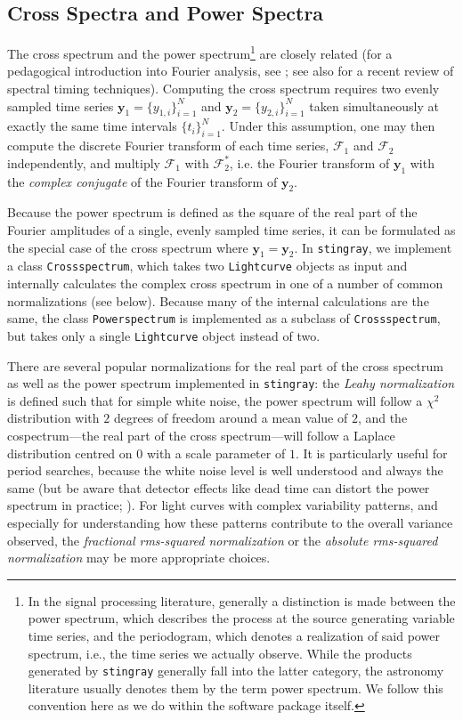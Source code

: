 \documentclass[twocolumn]{aastex62}
\newcommand{\stingray}{\texttt{stingray}\xspace}
\newcommand{\lightcurve}{\texttt{Lightcurve}\xspace}
\newcommand{\crossspectrum}{\texttt{Crossspectrum}\xspace}
\newcommand{\powerspectrum}{\texttt{Powerspectrum}\xspace}
\begin{document}
\subsection{Cross Spectra and Power Spectra}
\label{sec:csps}

The cross spectrum and the power spectrum\footnote{In the signal processing literature, generally a distinction is made between the power spectrum, which
describes the process at the source generating variable time series, and the periodogram, which denotes a realization of said power spectrum, i.e., the time series we actually observe. While the products generated by \stingray generally fall into the latter category, the astronomy literature usually denotes them by the term power spectrum. We follow this convention here as we do within the software package itself.} 
are closely related (for a pedagogical introduction into Fourier analysis, see \citealt{vanderklis1989}; see also \citealt{uttley2014} for a recent review of spectral timing techniques). 
Computing the cross spectrum requires two evenly sampled time series $\mathbf{y}_1 = \{y_{1,i}\}_{i=1}^{N} $ and $\mathbf{y}_2 =  \{y_{2,i}\}_{i=1}^{N}$ taken simultaneously at exactly the same time intervals $\{t_i \}_{i=1}^N$. 
Under this assumption, one may then compute the discrete Fourier transform of each time series, $\mathcal{F}_1$ and $\mathcal{F}_2$ independently, and multiply $\mathcal{F}_1$ with $\mathcal{F}^{*}_2$, i.e. the Fourier transform of $\mathbf{y}_1$ with the \textit{complex conjugate} of the Fourier transform of $\mathbf{y}_2$. 

Because the power spectrum is defined as the square of the real part of the Fourier amplitudes of a single, evenly sampled time series, it can be formulated as the special case of the cross spectrum where $\mathbf{y}_1 = \mathbf{y}_2$. 
In \stingray, we implement a class \crossspectrum, which takes two \lightcurve objects as input and internally calculates the complex cross spectrum in one of a number of common normalizations (see below).  Because many of the internal calculations are the same, the class \powerspectrum is implemented as a subclass of \crossspectrum, but takes only a single \lightcurve object instead of two. 

There are several popular normalizations for the real part of the cross spectrum as well as the power spectrum implemented in \stingray: the \textit{Leahy normalization} \citep{leahy1983} is defined such that for simple white noise, the power spectrum will follow a $\chi^2$ distribution with $2$ degrees of freedom around a mean value of $2$, and the cospectrum---the real part of the cross spectrum---will follow a Laplace distribution centred on $0$ with a scale parameter of $1$. It is particularly useful for period searches, because the white noise level is well understood and always the same (but be aware that detector effects like dead time can distort the power spectrum in practice; \citealt{Bachetti+15}).
For light curves with complex variability patterns, and especially for understanding how these patterns contribute to the overall variance observed, the \textit{fractional rms-squared normalization} \citep{belloni1990,miyamoto1992}  or the \textit{absolute rms-squared normalization} \citep{uttley2001} may be more appropriate choices. 
\end{document}
